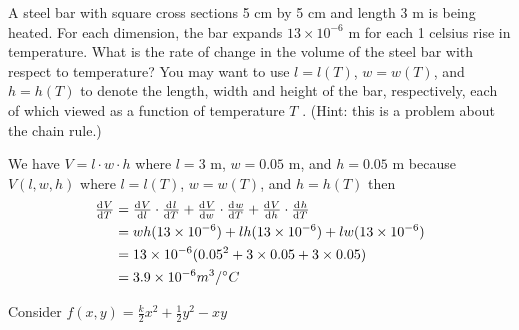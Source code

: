 \documentclass[12pt,letterpaper, onecolumn]{exam}
\begin{document}
\begin{questions}
\begin{solution}
		\end{solution}
		\question A steel bar with square cross sections 5 cm by 5 cm and length 3 m is being heated. For each dimension, the bar expands $13\times10^{-6}$ m for each 1 celsius rise in temperature.
		What is the rate of change in the volume of the steel bar with respect to temperature? You
		may want to use $l=l(T)$, $w=w(T )$, and $h=h(T )$ to denote the length, width and height of the bar, respectively, each of which viewed as a function of temperature $T$ . (Hint: this
		is a problem about the chain rule.)
		\begin{solution}
			We have $V=l\cdot w \cdot h$ where $l=3$ m, $w=0.05$ m, and $h=0.05$ m because $V(l,w,h)$ where $l=l(T)$, $w=w(T )$, and $h=h(T)$ then 
			\begin{align*}
				\od{V}{T}&=\od{V}{l}\cdot \od{l}{T}+\od{V}{w}\cdot\od{w}{T}+\od{V}{h}\cdot\od{h}{T}\\
				&=wh(13\times10^{-6})+lh(13\times10^{-6})+lw(13\times10^{-6})\\
				&=13\times10^{-6}(0.05^2+3\times0.05+3\times0.05)\\
				&=3.9\times10^{-6} m^3/^{\circ}C\\
			\end{align*}
		\end{solution}
		\question Consider $f(x,y)=\frac{k}{2}x^2+\frac{1}{2}y^2-xy$
\end{questions}
\end{document}

